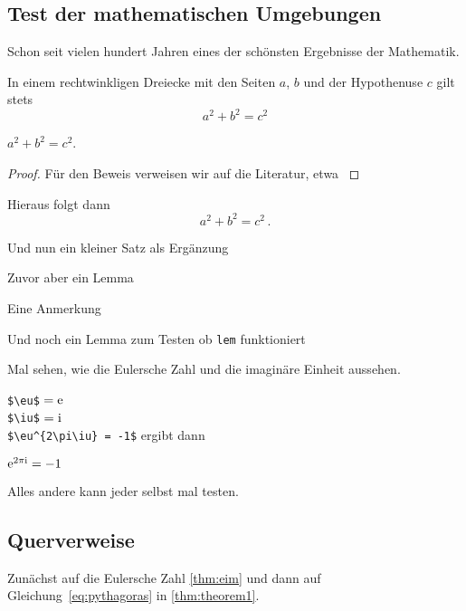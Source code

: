 \subsection{Test der mathematischen Umgebungen}\label{subsec:mumgebungen}
Schon seit vielen hundert Jahren eines der schönsten Ergebnisse der Mathematik.
%
\begin{theorem}\label{thm:theorem1}
In einem rechtwinkligen Dreiecke mit den Seiten $ a $, $ b $ und der Hypothenuse $ c $ gilt stets
\begin{equation}\label{eq:pythagoras}
a^{ 2 } +b^{ 2 } = c^{ 2 }
\end{equation}

$	a^{ 2 } +b^{ 2 } = c^{ 2 } $.
\end{theorem}
%
\begin{proof}
Für den Beweis verweisen wir auf die Literatur, etwa \textcite{efhn:2016}
\end{proof}
\begin{corollary}\label{cor:folgerung}
Hieraus folgt dann 
%
\[
	a^{ 2 } + b^{ 2 } = c^{ 2 } \, .
\]
%
\end{corollary}
%
\begin{proposition}\label{prop:prop}
Und nun ein kleiner Satz als Ergänzung 
\end{proposition}
%
\begin{lemma}\label{lem:lemma1}
Zuvor aber ein Lemma
\end{lemma}
%
\begin{remark}\label{rem:remark}
Eine Anmerkung
\end{remark}
\begin{lem}\label{lem:lemma2}
Und noch ein Lemma zum Testen ob \texttt{lem} funktioniert
\end{lem}
Mal sehen, wie die Eulersche Zahl und die imaginäre Einheit aussehen.

\verb|$\eu$| $=\mathrm{e}$ \\
\verb|$\iu$| $=\mathrm{i}$ \\
\verb|$\eu^{2\pi\iu} = -1$| ergibt dann  
\begin{theorem}\label{thm:eim}
$ \mathrm{e}^{ 2 \pi \mathrm{i} } = -1 $
\end{theorem}
Alles andere kann jeder selbst mal testen.
%
\subsection{Querverweise}\label{subsec:referenzen}
%
Zunächst auf die Eulersche Zahl \vref{thm:eim} und dann auf Gleichung~\eqref{eq:pythagoras} in \vref{thm:theorem1}.

